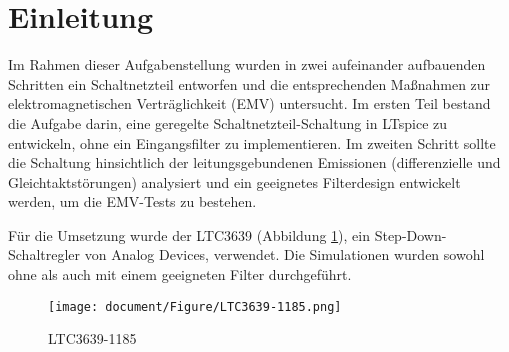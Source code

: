 \section{Einleitung} \label{sec:einleitung}

Im Rahmen dieser Aufgabenstellung wurden in zwei aufeinander aufbauenden Schritten ein Schaltnetzteil entworfen und die entsprechenden Maßnahmen zur elektromagnetischen Verträglichkeit (EMV) untersucht. Im ersten Teil bestand die Aufgabe darin, eine geregelte Schaltnetzteil-Schaltung in LTspice zu entwickeln, ohne ein Eingangsfilter zu implementieren. Im zweiten Schritt sollte die Schaltung hinsichtlich der leitungsgebundenen Emissionen (differenzielle und Gleichtaktstörungen) analysiert und ein geeignetes Filterdesign entwickelt werden, um die EMV-Tests zu bestehen.

Für die Umsetzung wurde der LTC3639 (Abbildung \ref{fig:LTC3639-1185}), ein Step-Down-Schaltregler von Analog Devices, verwendet. Die Simulationen wurden sowohl ohne als auch mit einem geeigneten Filter durchgeführt.


\begin{figure}[H]
    \centering
    \texttt{[image: document/Figure/LTC3639-1185.png]}
    \caption{LTC3639-1185}
    \label{fig:LTC3639-1185}
\end{figure}